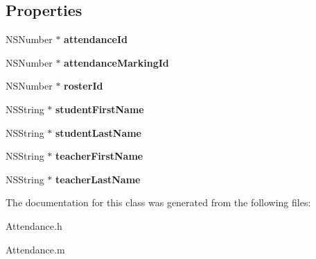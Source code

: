 \subsection*{Properties}
\begin{DoxyCompactItemize}
\item 
\hypertarget{interface_attendance_a47331d4a3bf6a66898af099cf7e8ceb3}{N\+S\+Number $\ast$ {\bfseries attendance\+Id}}\label{interface_attendance_a47331d4a3bf6a66898af099cf7e8ceb3}

\item 
\hypertarget{interface_attendance_a2a250e9bc55299c5f2c4936f1346a396}{N\+S\+Number $\ast$ {\bfseries attendance\+Marking\+Id}}\label{interface_attendance_a2a250e9bc55299c5f2c4936f1346a396}

\item 
\hypertarget{interface_attendance_abd800fad3cefbc7a28865fdbf9841ce5}{N\+S\+Number $\ast$ {\bfseries roster\+Id}}\label{interface_attendance_abd800fad3cefbc7a28865fdbf9841ce5}

\item 
\hypertarget{interface_attendance_ac19139347042d483a23013202a923ff8}{N\+S\+String $\ast$ {\bfseries student\+First\+Name}}\label{interface_attendance_ac19139347042d483a23013202a923ff8}

\item 
\hypertarget{interface_attendance_a0750a37e87bdcd6e188846b174faf211}{N\+S\+String $\ast$ {\bfseries student\+Last\+Name}}\label{interface_attendance_a0750a37e87bdcd6e188846b174faf211}

\item 
\hypertarget{interface_attendance_aa8205f78bffac5fd2dd3ce2a44ef1e96}{N\+S\+String $\ast$ {\bfseries teacher\+First\+Name}}\label{interface_attendance_aa8205f78bffac5fd2dd3ce2a44ef1e96}

\item 
\hypertarget{interface_attendance_ad532e084c8758266e0106649e4f5605e}{N\+S\+String $\ast$ {\bfseries teacher\+Last\+Name}}\label{interface_attendance_ad532e084c8758266e0106649e4f5605e}

\end{DoxyCompactItemize}


The documentation for this class was generated from the following files\+:\begin{DoxyCompactItemize}
\item 
Attendance.\+h\item 
Attendance.\+m\end{DoxyCompactItemize}
